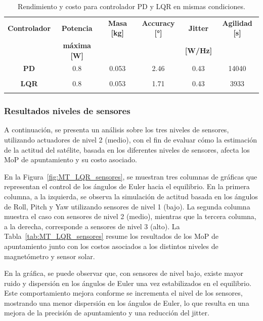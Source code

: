 \begin{table}[h!]
	\centering
	\caption{Rendimiento y costo para controlador PD y LQR en mismas condiciones.}
	\begin{tabular}{|c|c|c|c|c|c|}
		\hline
		\textbf{Controlador}   & \textbf{Potencia} & \textbf{Masa [kg]} & \textbf{Accuracy [°]} & \textbf{Jitter} & \textbf{Agilidad [s]}  \\ 
		  & \textbf{máxima [W]} & & & \textbf{[W/Hz]} &  \\
		\hline
		\textbf{PD}   & 0.8  & 0.053  & 2.46 & 0.43 & 14040   \\
		&  &   &  &  &    \\
		\hline
		\textbf{LQR}   & 0.8  & 0.053  & 1.71 & 0.43 & 3933   \\
		& & & & &   \\
		\hline
	\end{tabular}
	\label{tab:PD_LQR_nivel2}
\end{table}

\subsubsection{Resultados niveles de sensores}

A continuación, se presenta un análisis sobre los tres niveles de sensores, utilizando actuadores de nivel 2 (medio), con el fin de evaluar cómo la estimación de la actitud del satélite, basada en los diferentes niveles de sensores, afecta los MoP de apuntamiento y su costo asociado.

En la Figura~\ref{fig:MT_LQR_sensores}, se muestran tres columnas de gráficas que representan el control de los ángulos de Euler hacia el equilibrio. En la primera columna, a la izquierda, se observa la simulación de actitud basada en los ángulos de Roll, Pitch y Yaw utilizando sensores de nivel 1 (bajo). La segunda columna muestra el caso con sensores de nivel 2 (medio), mientras que la tercera columna, a la derecha, corresponde a sensores de nivel 3 (alto). La Tabla~\ref{tab:MT_LQR_sensores} resume los resultados de los MoP de apuntamiento junto con los costos asociados a los distintos niveles de magnetómetro y sensor solar.

En la gráfica, se puede observar que, con sensores de nivel bajo, existe mayor ruido y dispersión en los ángulos de Euler una vez estabilizados en el equilibrio. Este comportamiento mejora conforme se incrementa el nivel de los sensores, mostrando una menor dispersión en los ángulos de Euler, lo que resulta en una mejora de la precisión de apuntamiento y una reducción del jitter.

